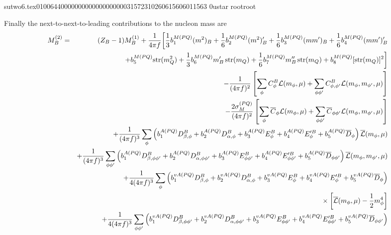                                                                                                                                                                                                                                                                                       sutwo6.tex                                                                                          0100644 0000000 0000000 00000315723 10260615606 011563  0                                                                                                    ustar   root                            root                                                                                                                                                                                                                   \documentclass[prd,amssymb,amsmath,showpacs,nofootinbib,superscriptaddress]{revtex4}
\begin{document}
Finally the next-to-next-to-leading contributions to the nucleon mass are
{\small
\begin{eqnarray}
  M_B^{(2)} &=& ( Z_B - 1) M_B^{(1)} 
    + \frac{1}{4\pi f} \bigg[ \frac{1}{3} b_1^{M \pq} (m^2)_B +
        \frac{1}{6} b_2^{M \pq} (m^2)_B^\prime + \frac{1}{6} b_3^{M
          \pq} (m m')_B +\frac{1}{6} b_4^{M \pq} (m m')_B^\prime \notag \\
&&  +   b_5^{M \pq} \str (m_Q^2) + \frac{1}{3} b_6^{M \pq} m_B^\prime
        \, \str (m_Q) + \frac{1}{6} b_7^{M \pq} m_B^{\prime\prime} \,
        \str(m_Q) + b_8^{M \pq} [\str (m_Q)]^2 \bigg] \notag \\
&&  - \frac{1}{(4 \pi f)^2} \left[ \sum_{\phi} C^B_\phi \c{L}
        (m_\phi,\mu) 
        + \sum_{\phi \phi'} C^B_{\phi,\phi'} \c{L}(m_\phi,m_{\phi'},\mu)
        \right] \notag \\
&&  - \frac{2 \sigma_M^{(PQ)}}{(4 \pi f)^2} 
       \left[ \sum_\phi \ol C_\phi \c{L} (m_\phi,\mu)
        + \sum_{\phi \phi'} \ol C_{\phi \phi'} \c{L} (m_\phi,
         m_{\phi'},\mu) \right] \notag \\
&&  + \frac{1}{(4 \pi f)^3} \sum_{\phi} \left( 
        b_1^{A \pq} D^B_{\b,\phi} + b_2^{A \pq} D^B_{\a,\phi} + b_3^{A
          \pq} E_\phi^B + b_4^{A \pq} E^{\prime B}_\phi + b_5^{A \pq}
          \ol D_\phi \right) 
        \ol{\c{L}} (m_\phi, \mu) \notag \\
&&  + \frac{1}{(4 \pi f)^3} \sum_{\phi \phi'} \left( 
        b_1^{A \pq} D^B_{\b,\phi\phi'} + b_2^{A \pq}
         D^B_{\a,\phi\phi'} + b_3^{A \pq} E_{\phi\phi'}^B + b_4^{A \pq}
         E^{\prime B}_{\phi \phi'} 
        + b_5^{A \pq} \ol D_{\phi\phi'} \right) 
        \ol{\c{L}} (m_\phi, m_{\phi'}, \mu) \notag \\
&&  + \frac{1}{4 (4 \pi f)^3} \sum_\phi  \left( 
        b_1^{vA \pq} D^B_{\b,\phi} + b_2^{vA \pq} D^B_{\a,\phi} 
        + b_3^{vA \pq} E_\phi^B + b_4^{vA \pq} E_{\phi}^{\prime B}  
        + b_5^{vA \pq} \ol D_\phi \right) \notag \\
&& \phantom{bigspacethattakesupspace}
        \times \left[ \ol{\c{L}} (m_\phi, \mu) - \frac{1}{2} m_\phi^4
        \right] \notag \\
&&  + \frac{1}{4 (4 \pi f)^3} \sum_{\phi \phi'} \left( 
        b_1^{vA \pq} D^B_{\b,\phi\phi'} + b_2^{vA \pq}
         D^B_{\a,\phi\phi'} + b_3^{vA \pq} E_{\phi\phi'}^B 
        + b_4^{vA \pq} E_{\phi \phi'}^{\prime B} 
        + b_5^{vA \pq} \ol D_{\phi\phi'} \right) \notag \\
&& \phantom{bigspacethattakesupspace}

\end{eqnarray}}
\end{document}
